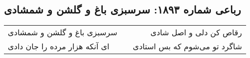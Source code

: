 \begin{center}
\section*{رباعی شماره ۱۸۹۳: سرسبزی باغ و گلشن و شمشادی}
\label{sec:1893}
\begin{longtable}{l p{0.5cm} r}
سرسبزی باغ و گلشن و شمشادی
&&
رقاص کن دلی و اصل شادی
\\
ای آنکه هزار مرده را جان دادی
&&
شاگرد تو می‌شوم که بس استادی
\\
\end{longtable}
\end{center}
